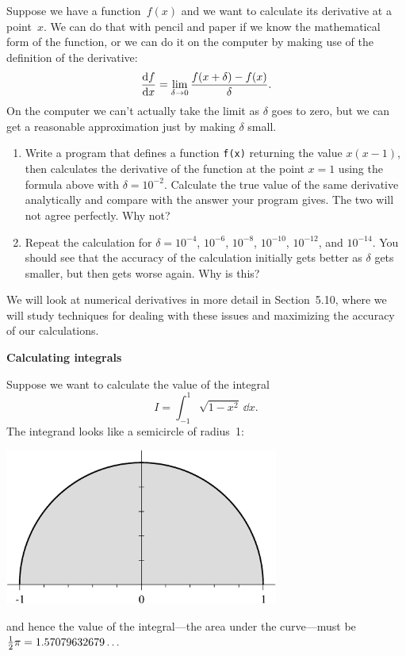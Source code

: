 \documentclass[12pt]{article}
\begin{document}
\begin{exercises}
\smallskip\noindent Suppose we have a function~$f(x)$ and we want to
calculate its derivative at a point~$x$.  We can do that with pencil and
paper if we know the mathematical form of the function, or we can do it on
the computer by making use of the definition of the derivative:
\begin{displaymath}
{\mathrm{d}f\over\mathrm{d}x} = \lim_{\delta\to0} {f(x+\delta)-f(x)\over\delta}.
\end{displaymath}
On the computer we can't actually take the limit as $\delta$ goes to
zero, but we can get a reasonable approximation just by making $\delta$
small.
\begin{enumerate}
\item Write a program that defines a function \verb|f(x)| returning the
  value $x(x-1)$, then calculates the derivative of the function at the
  point $x=1$ using the formula above with $\delta=10^{-2}$.  Calculate
  the true value of the same derivative analytically and compare with the
  answer your program gives.  The two will not agree perfectly.  Why not?
\item Repeat the calculation for $\delta=10^{-4}$, $10^{-6}$, $10^{-8}$,
  $10^{-10}$, $10^{-12}$, and $10^{-14}$.  You should see that the accuracy
  of the calculation initially gets better as $\delta$ gets smaller, but
  then gets worse again.  Why is this?
\end{enumerate}
We will look at numerical derivatives in more detail in Section~5.10, where
we will study techniques for dealing with these issues and maximizing the
accuracy of our calculations.



\exercise \textbf{Calculating integrals}

\smallskip\noindent Suppose we want to calculate the value of the
integral
\begin{displaymath}
I = \int_{-1}^1 \sqrt{1-x^2} \>\dd x.
\end{displaymath}
The integrand looks like a semicircle of radius~1:
\bigskip
\begin{center}
\includegraphics[width=9cm]{semicircle.eps}
\end{center}
\medskip and hence the value of the integral---the area under the
curve---must be $\tfrac12\pi=1.57079632679\ldots$


\end{exercises}
\end{document}
